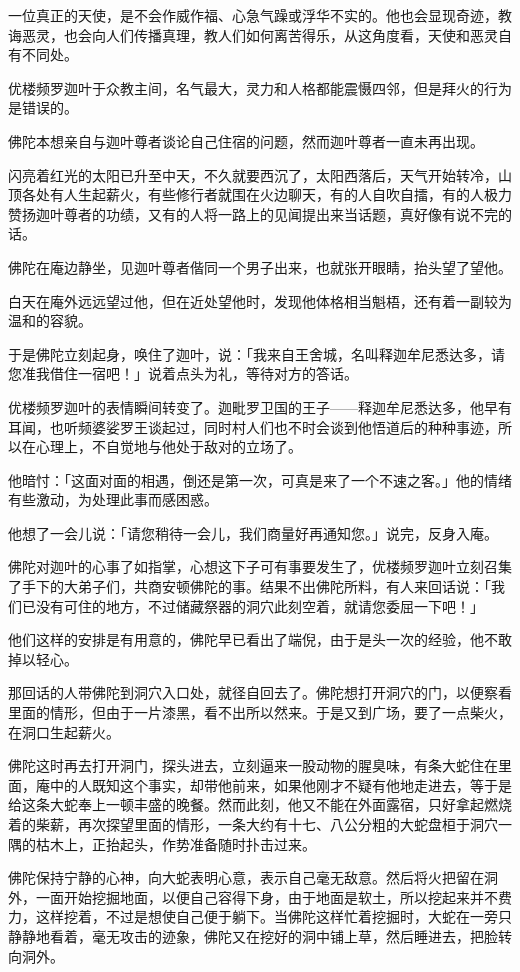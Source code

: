 \documentclass[twoside,openany]{book}
\begin{document}
一位真正的天使，是不会作威作福、心急气躁或浮华不实的。他也会显现奇迹，教诲恶灵，也会向人们传播真理，教人们如何离苦得乐，从这角度看，天使和恶灵自有不同处。

优楼频罗迦叶于众教主间，名气最大，灵力和人格都能震慑四邻，但是拜火的行为是错误的。

佛陀本想亲自与迦叶尊者谈论自己住宿的问题，然而迦叶尊者一直未再出现。

闪亮着红光的太阳已升至中天，不久就要西沉了，太阳西落后，天气开始转冷，山顶各处有人生起薪火，有些修行者就围在火边聊天，有的人自吹自擂，有的人极力赞扬迦叶尊者的功绩，又有的人将一路上的见闻提出来当话题，真好像有说不完的话。

佛陀在庵边静坐，见迦叶尊者偕同一个男子出来，也就张开眼睛，抬头望了望他。

白天在庵外远远望过他，但在近处望他时，发现他体格相当魁梧，还有着一副较为温和的容貌。

于是佛陀立刻起身，唤住了迦叶，说：「我来自王舍城，名叫释迦牟尼悉达多，请您准我借住一宿吧！」说着点头为礼，等待对方的答话。

优楼频罗迦叶的表情瞬间转变了。迦毗罗卫国的王子——释迦牟尼悉达多，他早有耳闻，也听频婆娑罗王谈起过，同时村人们也不时会谈到他悟道后的种种事迹，所以在心理上，不自觉地与他处于敌对的立场了。

他暗忖：「这面对面的相遇，倒还是第一次，可真是来了一个不速之客。」他的情绪有些激动，为处理此事而感困惑。

他想了一会儿说：「请您稍待一会儿，我们商量好再通知您。」说完，反身入庵。

佛陀对迦叶的心事了如指掌，心想这下子可有事要发生了，优楼频罗迦叶立刻召集了手下的大弟子们，共商安顿佛陀的事。结果不出佛陀所料，有人来回话说：「我们已没有可住的地方，不过储藏祭器的洞穴此刻空着，就请您委屈一下吧！」

他们这样的安排是有用意的，佛陀早已看出了端倪，由于是头一次的经验，他不敢掉以轻心。

那回话的人带佛陀到洞穴入口处，就径自回去了。佛陀想打开洞穴的门，以便察看里面的情形，但由于一片漆黑，看不出所以然来。于是又到广场，要了一点柴火，在洞口生起薪火。

佛陀这时再去打开洞门，探头进去，立刻逼来一股动物的腥臭味，有条大蛇住在里面，庵中的人既知这个事实，却带他前来，如果他刚才不疑有他地走进去，等于是给这条大蛇奉上一顿丰盛的晚餐。然而此刻，他又不能在外面露宿，只好拿起燃烧着的柴薪，再次探望里面的情形，一条大约有十七、八公分粗的大蛇盘桓于洞穴一隅的枯木上，正抬起头，作势准备随时扑击过来。

佛陀保持宁静的心神，向大蛇表明心意，表示自己毫无敌意。然后将火把留在洞外，一面开始挖掘地面，以便自己容得下身，由于地面是软土，所以挖起来并不费力，这样挖着，不过是想使自己便于躺下。当佛陀这样忙着挖掘时，大蛇在一旁只静静地看着，毫无攻击的迹象，佛陀又在挖好的洞中铺上草，然后睡进去，把脸转向洞外。
\end{document}
